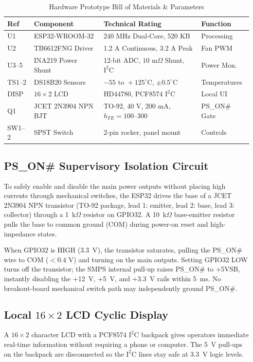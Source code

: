 \documentclass[conference]{IEEEtran}
\begin{document}
\begin{table}[htbp]
\caption{Hardware Prototype Bill of Materials \& Parameters}
\begin{center}
\begin{tabular}{llll}
\toprule
\textbf{Ref} & \textbf{Component} & \textbf{Technical Rating} & \textbf{Function} \\
\midrule
U1 & ESP32-WROOM-32 & 240 MHz Dual-Core, 520 KB & Processing \\
U2 & TB6612FNG Driver & 1.2 A Continuous, 3.2 A Peak & Fan PWM \\
U3--5 & INA219 Power Shunt & 12-bit ADC, $10\text{ m}\Omega$ Shunt, $\text{I}^2\text{C}$ & Power Mon. \\
TS1--2 & DS18B20 Sensors & $-55\text{ to }+125^\circ\text{C}$, $\pm 0.5^\circ\text{C}$ & Temperatures \\
DISP & $16\times2$ LCD & HD44780, PCF8574 $\text{I}^2\text{C}$ & Local UI \\
Q1 & JCET 2N3904 NPN BJT & TO-92, 40 V, 200 mA, $h_{FE} = 100\text{--}300$ & PS\_ON\# Gate \\
SW1--2 & SPST Switch & 2-pin rocker, panel mount & Controls \\
\bottomrule
\end{tabular}
\label{tab1}
\end{center}
\end{table}

\subsection{PS\_ON\# Supervisory Isolation Circuit}
To safely enable and disable the main power outputs without placing high currents through mechanical switches, the ESP32 drives the base of a JCET 2N3904 NPN transistor (TO-92 package, lead 1: emitter, lead 2: base, lead 3: collector) through a 1~k$\Omega$ resistor on GPIO32. A 10~k$\Omega$ base-emitter resistor pulls the base to common ground (COM) during power-on reset and high-impedance states.

When GPIO32 is HIGH (3.3~V), the transistor saturates, pulling the PS\_ON\# wire to COM ($< 0.4\text{ V}$) and turning on the main outputs. Setting GPIO32 LOW turns off the transistor; the SMPS internal pull-up raises PS\_ON\# to +5VSB, instantly disabling the +12~V, +5~V, and +3.3~V rails within 5~ms. No breakout-board mechanical switch path may independently ground PS\_ON\#.

\subsection{Local $16\times2$ LCD Cyclic Display}
A $16\times2$ character LCD with a PCF8574 $\text{I}^2\text{C}$ backpack gives operators immediate real-time information without requiring a phone or computer. The 5~V pull-ups on the backpack are disconnected so the $\text{I}^2\text{C}$ lines stay safe at 3.3~V logic levels.
\end{document}
